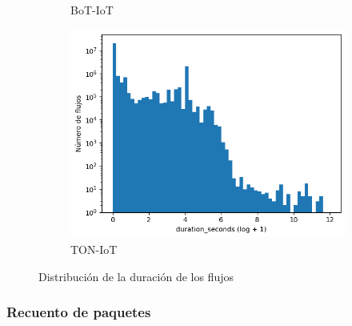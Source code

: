 \begin{figure}[H]
\begin{subfigure}[b]{0.26\textwidth}
        \caption{BoT-IoT}
    \end{subfigure}
    \hfill
    \begin{subfigure}[b]{0.26\textwidth}
        \centering
        \includegraphics[width=\linewidth]{media/packet_pincer_toniot/duration_seconds_log_x_log_y.png}
        \caption{TON-IoT}
    \end{subfigure}
       \caption{Distribución de la duración de los flujos}
       \label{fig:packet_pincer_duration}
\end{figure}

\subsubsection{Recuento de paquetes}

